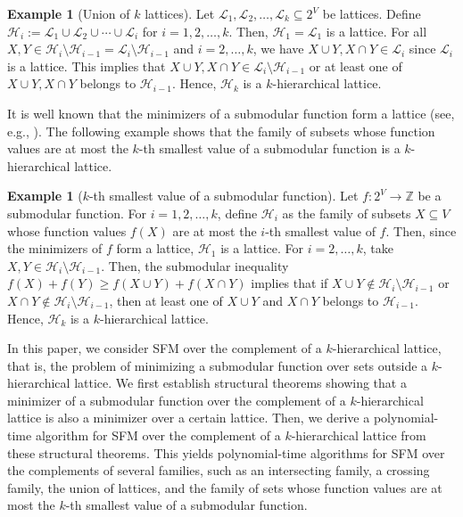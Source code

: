 \documentclass[11pt,letterpaper]{article}
\theoremstyle{plain}
\theoremstyle{definition}
\newtheorem{example}[theorem]{Example}
\begin{document}
\begin{example}[Union of $k$ lattices]
\label{ex3}
Let $\mathcal{L}_1,\mathcal{L}_2,\ldots,\mathcal{L}_k\subseteq 2^V$ be lattices.
Define $\mathcal{H}_i:=\mathcal{L}_1\cup \mathcal{L}_2\cup \cdots \cup \mathcal{L}_i$ for $i=1,2,\ldots,k$.
Then, $\mathcal{H}_1=\mathcal{L}_1$ is a lattice.
For all $X,Y\in \mathcal{H}_i\setminus \mathcal{H}_{i-1}=\mathcal{L}_i\setminus \mathcal{H}_{i-1}$ and $i=2,\ldots,k$, we have $X\cup Y,X\cap Y\in \mathcal{L}_i$ since $\mathcal{L}_i$ is a lattice.
This implies that $X\cup Y,X\cap Y\in \mathcal{L}_i\setminus \mathcal{H}_{i-1}$ or at least one of $X\cup Y,X\cap Y$ belongs to $\mathcal{H}_{i-1}$.
Hence, $\mathcal{H}_k$ is a $k$-hierarchical lattice.
\end{example}

It is well known that the minimizers of a submodular function form a lattice (see, e.g., \cite{fujishige2005}).
The following example shows that the family of subsets whose function values are at most the $k$-th smallest value of a submodular function is a $k$-hierarchical lattice.

\begin{example}[$k$-th smallest value of a submodular function]
\label{ex4}
Let $f:2^V\to \mathbb{Z}$ be a submodular function.
For $i=1,2,\ldots,k$, define $\mathcal{H}_i$ as the family of subsets $X\subseteq V$ whose function values $f(X)$ are at most the $i$-th smallest value of $f$.
Then, since the minimizers of $f$ form a lattice, $\mathcal{H}_1$ is a lattice.
For $i=2,\ldots,k$, take $X,Y\in \mathcal{H}_i\setminus \mathcal{H}_{i-1}$.
Then, the submodular inequality $f(X)+f(Y)\ge f(X\cup Y)+f(X\cap Y)$ implies that if $X\cup Y\notin \mathcal{H}_i\setminus \mathcal{H}_{i-1}$ or $X\cap Y\notin \mathcal{H}_i\setminus \mathcal{H}_{i-1}$, then at least one of $X\cup Y$ and $X\cap Y$ belongs to $\mathcal{H}_{i-1}$.
Hence, $\mathcal{H}_{k}$ is a $k$-hierarchical lattice.
\end{example}

In this paper, we consider SFM over the complement of a $k$-hierarchical lattice, that is, the problem of minimizing a submodular function over sets outside a $k$-hierarchical lattice.
We first establish structural theorems showing that a minimizer of a submodular function over the complement of a $k$-hierarchical lattice is also a minimizer over a certain lattice.
Then, we derive a polynomial-time algorithm for SFM over the complement of a $k$-hierarchical lattice from these structural theorems.
This yields polynomial-time algorithms for SFM over the complements of several families, such as an intersecting family, a crossing family, the union of lattices, and the family of sets whose function values are at most the $k$-th smallest value of a submodular function.
\end{document}
